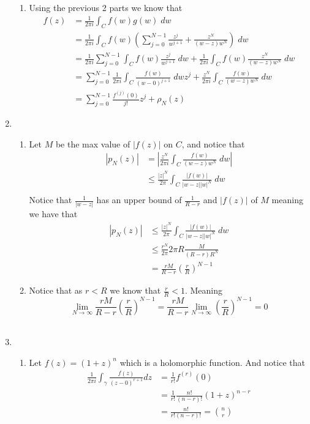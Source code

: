 \documentclass[12pt]{amsart}
\theoremstyle{definition}
\newcommand{\ra}{\rightarrow}
\begin{document}
\begin{enumerate}
\begin{enumerate}
    \item Using the previous 2 parts we know that 
    \begin{align*}
        f(z)&=\frac{1}{2\pi i}\int_C f(w)g(w)\;dw\\
        &=\frac{1}{2\pi i}\int_C f(w)\left(\sum_{j=0}^{N-1}\frac{z^j}{w^{j+1}}+\frac{z^N}{(w-z)w^N}\right)\;dw\\
        &=\frac{1}{2\pi i}\sum_{j=0}^{N-1}\int_C f(w)\frac{z^j}{w^{j+1}}\;dw+\frac{1}{2\pi i}\int_C f(w)\frac{z^N}{(w-z)w^N}\;dw\\
        &=\sum_{j=0}^{N-1}\frac{1}{2\pi i}\int_C \frac{f(w)}{(w-0)^{j+1}}\;dw z^j+\frac{z^N}{2\pi i}\int_C \frac{f(w)}{(w-z)w^N}\;dw\\
        &=\sum_{j=0}^{N-1}\frac{f^{(j)}(0)}{j!} z^j+\rho_N(z)
    \end{align*}
    \end{enumerate}

    \item
    \begin{enumerate}
        \item Let $M$ be the max value of $|f(z)|$ on $C$, and notice that 
        \begin{align*}
            |p_N(z)|&=\left|\frac{z^N}{2\pi i}\int_C \frac{f(w)}{(w-z)w^N}\;dw\right|\\
            &\leq \frac{|z|^N}{2\pi}\int_C \frac{|f(w)|}{|w-z||w|^N}\;dw\\
        \end{align*}
        Notice that $\frac{1}{|w-z|}$ has an upper bound of $\frac{1}{R-r}$ and $|f(z)|$ of $M$ meaning we have that 
        \begin{align*}
            |p_N(z)|&\leq \frac{|z|^N}{2\pi}\int_C \frac{|f(w)|}{|w-z||w|^N}\;dw\\
            &\leq \frac{r^N}{2\pi}2\pi R\frac{M}{(R-r)R^N}\\
            &=\frac{rM}{R-r}\left(\frac{r}{R}\right)^{N-1}
        \end{align*}

        \item Notice that as $r<R$ we know that $\frac{r}{R}<1$. Meaning $$\lim_{N\ra \infty}\frac{rM}{R-r}\left(\frac{r}{R}\right)^{N-1}=\frac{rM}{R-r}\lim_{N\ra \infty}\left(\frac{r}{R}\right)^{N-1}=0$$\\
    \end{enumerate}

\item 
\begin{enumerate}
    \item Let $f(z)=(1+z)^n$ which is a holomorphic function. And notice that
\begin{align*}
    \frac{1}{2\pi i}\int_{\gamma}\frac{f(z)}{(z-0)^{r+1}}dz&=\frac{1}{r!}f^{(r)}(0)\\
    &=\frac{1}{r!}\frac{n!}{(n-r)!}(1+z)^{n-r}\\
    &=\frac{n!}{r!(n-r)!}={n\choose r}
\end{align*}


\end{enumerate}
\end{enumerate}
\end{document}
